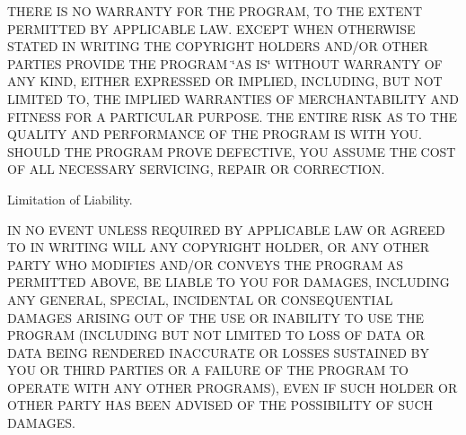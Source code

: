 T\-H\-E\-R\-E I\-S N\-O W\-A\-R\-R\-A\-N\-T\-Y F\-O\-R T\-H\-E P\-R\-O\-G\-R\-A\-M, T\-O T\-H\-E E\-X\-T\-E\-N\-T P\-E\-R\-M\-I\-T\-T\-E\-D B\-Y A\-P\-P\-L\-I\-C\-A\-B\-L\-E L\-A\-W. E\-X\-C\-E\-P\-T W\-H\-E\-N O\-T\-H\-E\-R\-W\-I\-S\-E S\-T\-A\-T\-E\-D I\-N W\-R\-I\-T\-I\-N\-G T\-H\-E C\-O\-P\-Y\-R\-I\-G\-H\-T H\-O\-L\-D\-E\-R\-S A\-N\-D/\-O\-R O\-T\-H\-E\-R P\-A\-R\-T\-I\-E\-S P\-R\-O\-V\-I\-D\-E T\-H\-E P\-R\-O\-G\-R\-A\-M \char`\"{}\-A\-S I\-S\char`\"{} W\-I\-T\-H\-O\-U\-T W\-A\-R\-R\-A\-N\-T\-Y O\-F A\-N\-Y K\-I\-N\-D, E\-I\-T\-H\-E\-R E\-X\-P\-R\-E\-S\-S\-E\-D O\-R I\-M\-P\-L\-I\-E\-D, I\-N\-C\-L\-U\-D\-I\-N\-G, B\-U\-T N\-O\-T L\-I\-M\-I\-T\-E\-D T\-O, T\-H\-E I\-M\-P\-L\-I\-E\-D W\-A\-R\-R\-A\-N\-T\-I\-E\-S O\-F M\-E\-R\-C\-H\-A\-N\-T\-A\-B\-I\-L\-I\-T\-Y A\-N\-D F\-I\-T\-N\-E\-S\-S F\-O\-R A P\-A\-R\-T\-I\-C\-U\-L\-A\-R P\-U\-R\-P\-O\-S\-E. T\-H\-E E\-N\-T\-I\-R\-E R\-I\-S\-K A\-S T\-O T\-H\-E Q\-U\-A\-L\-I\-T\-Y A\-N\-D P\-E\-R\-F\-O\-R\-M\-A\-N\-C\-E O\-F T\-H\-E P\-R\-O\-G\-R\-A\-M I\-S W\-I\-T\-H Y\-O\-U. S\-H\-O\-U\-L\-D T\-H\-E P\-R\-O\-G\-R\-A\-M P\-R\-O\-V\-E D\-E\-F\-E\-C\-T\-I\-V\-E, Y\-O\-U A\-S\-S\-U\-M\-E T\-H\-E C\-O\-S\-T O\-F A\-L\-L N\-E\-C\-E\-S\-S\-A\-R\-Y S\-E\-R\-V\-I\-C\-I\-N\-G, R\-E\-P\-A\-I\-R O\-R C\-O\-R\-R\-E\-C\-T\-I\-O\-N.


\begin{DoxyEnumerate}
\item Limitation of Liability.
\end{DoxyEnumerate}

I\-N N\-O E\-V\-E\-N\-T U\-N\-L\-E\-S\-S R\-E\-Q\-U\-I\-R\-E\-D B\-Y A\-P\-P\-L\-I\-C\-A\-B\-L\-E L\-A\-W O\-R A\-G\-R\-E\-E\-D T\-O I\-N W\-R\-I\-T\-I\-N\-G W\-I\-L\-L A\-N\-Y C\-O\-P\-Y\-R\-I\-G\-H\-T H\-O\-L\-D\-E\-R, O\-R A\-N\-Y O\-T\-H\-E\-R P\-A\-R\-T\-Y W\-H\-O M\-O\-D\-I\-F\-I\-E\-S A\-N\-D/\-O\-R C\-O\-N\-V\-E\-Y\-S T\-H\-E P\-R\-O\-G\-R\-A\-M A\-S P\-E\-R\-M\-I\-T\-T\-E\-D A\-B\-O\-V\-E, B\-E L\-I\-A\-B\-L\-E T\-O Y\-O\-U F\-O\-R D\-A\-M\-A\-G\-E\-S, I\-N\-C\-L\-U\-D\-I\-N\-G A\-N\-Y G\-E\-N\-E\-R\-A\-L, S\-P\-E\-C\-I\-A\-L, I\-N\-C\-I\-D\-E\-N\-T\-A\-L O\-R C\-O\-N\-S\-E\-Q\-U\-E\-N\-T\-I\-A\-L D\-A\-M\-A\-G\-E\-S A\-R\-I\-S\-I\-N\-G O\-U\-T O\-F T\-H\-E U\-S\-E O\-R I\-N\-A\-B\-I\-L\-I\-T\-Y T\-O U\-S\-E T\-H\-E P\-R\-O\-G\-R\-A\-M (I\-N\-C\-L\-U\-D\-I\-N\-G B\-U\-T N\-O\-T L\-I\-M\-I\-T\-E\-D T\-O L\-O\-S\-S O\-F D\-A\-T\-A O\-R D\-A\-T\-A B\-E\-I\-N\-G R\-E\-N\-D\-E\-R\-E\-D I\-N\-A\-C\-C\-U\-R\-A\-T\-E O\-R L\-O\-S\-S\-E\-S S\-U\-S\-T\-A\-I\-N\-E\-D B\-Y Y\-O\-U O\-R T\-H\-I\-R\-D P\-A\-R\-T\-I\-E\-S O\-R A F\-A\-I\-L\-U\-R\-E O\-F T\-H\-E P\-R\-O\-G\-R\-A\-M T\-O O\-P\-E\-R\-A\-T\-E W\-I\-T\-H A\-N\-Y O\-T\-H\-E\-R P\-R\-O\-G\-R\-A\-M\-S), E\-V\-E\-N I\-F S\-U\-C\-H H\-O\-L\-D\-E\-R O\-R O\-T\-H\-E\-R P\-A\-R\-T\-Y H\-A\-S B\-E\-E\-N A\-D\-V\-I\-S\-E\-D O\-F T\-H\-E P\-O\-S\-S\-I\-B\-I\-L\-I\-T\-Y O\-F S\-U\-C\-H D\-A\-M\-A\-G\-E\-S.


